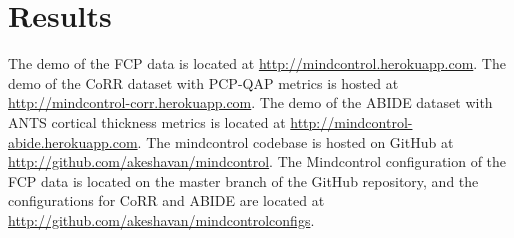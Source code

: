 \section{Results}

The demo of the FCP data is located at \href{http://mindcontrol.herokuapp.com}{http://mindcontrol.herokuapp.com}. The demo of the CoRR dataset with PCP-QAP metrics is hosted at \href{http://mindcontrol-corr.herokuapp.com}{http://mindcontrol-corr.herokuapp.com}. The demo of the ABIDE dataset with ANTS cortical thickness metrics is located at \href{http://mindcontrol-abide.herokuapp.com}{http://mindcontrol-abide.herokuapp.com}. The mindcontrol codebase is hosted on GitHub at \href{http://github.com/akeshavan/mindcontrol}{http://github.com/akeshavan/mindcontrol}. The Mindcontrol configuration of the FCP data is located on the master branch of the GitHub repository, and the configurations for CoRR and ABIDE are located at \href{http://github.com/akeshavan/mindcontrol_configs}{http://github.com/akeshavan/mindcontrol\textunderscore configs}.

